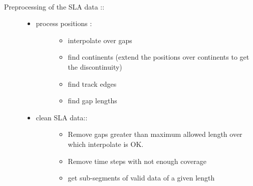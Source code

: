 \documentclass[letterpaper,10pt,english]{sphinxmanual}
\begin{document}

\begin{fulllineitems}
\label{altimetry.tools.spectrum:altimetry.tools.spectrum.preprocess}~\begin{description}
\item[{Preprocessing of the SLA data ::}] \leavevmode\begin{itemize}
\item {} \begin{description}
\item[{process positions :}] \leavevmode\begin{itemize}
\item {} 
interpolate over gaps

\item {} 
find continents (extend the positions over continents to get the discontinuity)

\item {} 
find track edges

\item {} 
find gap lengths

\end{itemize}

\end{description}

\item {} \begin{description}
\item[{clean SLA data::}] \leavevmode\begin{itemize}
\item {} 
Remove gaps greater than maximum allowed length over which interpolate is OK.

\item {} 
Remove time steps with not enough coverage

\item {} 
get sub-segments of valid data of a given length

\end{itemize}


\end{description}
\end{itemize}
\end{description}
\end{fulllineitems}
\end{document}
